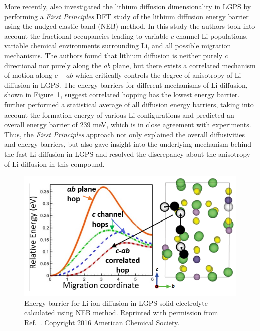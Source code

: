 \documentclass[../main.tex]{subfiles}
\begin{document}
More recently, \citeauthor{Bhandari2016} also investigated the lithium diffusion dimensionality in LGPS by performing a \textit{First Principles} DFT study of the lithium diffusion energy barrier using the nudged elastic band (NEB) method.\cite{Bhandari2016} In this study the authors took into account the fractional occupancies leading to variable $c$ channel Li populations, variable chemical environments surrounding Li, and all possible migration mechanisms. The authors found that lithium diffusion is neither purely $c$ directional nor purely along the $ab$ plane, but there exists a correlated mechanism of motion along $c-ab$ which critically controls the degree of anisotropy of Li diffusion in LGPS. The energy barriers for different mechanisms of Li-diffusion, shown in Figure~\ref{fig:lgps}, suggest correlated hopping has the lowest energy barrier. %
\citeauthor{Bhandari2016} further performed a statistical average of all diffusion energy barriers, taking into account the formation energy of various Li configurations and predicted an overall energy barrier of 239 meV, which is in close agreement with experiments.\cite{Kamaya2011} Thus, the \textit{First Principles} approach not only explained the overall diffusivities and energy barriers, but also gave insight into the underlying mechanism behind the fast Li diffusion in LGPS and resolved the discrepancy about the anisotropy of Li diffusion in this compound.

\begin{figure}
    \centering
    \includegraphics[scale=1.2]{figures/lgps.png}
    \caption{Energy barrier for Li-ion diffusion in LGPS solid electrolyte calculated using NEB method. Reprinted with permission from Ref.~. Copyright 2016 American Chemical Society.}
    \label{fig:lgps}
\end{figure}
\end{document}
